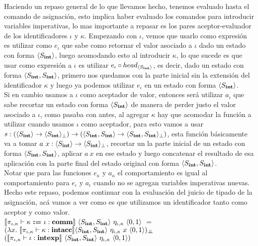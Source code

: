 Haciendo un repaso general de lo que llevamos hecho, tenemos evaluado hasta el comando
de asignaci\'on, esto implica haber evaluado los comandos para introducir variables 
imperativas, lo mas importante a repasar es los pares aceptor-evaluador de los
identificadores $\iota$ y $\kappa$. Empezando con $\iota$, vemos que usarlo como
expresi\'on es utilizar como $e_\iota$ que
sabe como retornar el valor asociado a $\iota$ dado un estado con forma $\langle S_{\textbf{int}} \rangle$,
luego acomodando esto al introducir $\kappa$, lo que sucede es que usar como expresi\'on
a $\iota$ es utilizar $e_\iota \circ head_{\langle S_{\textbf{int}} \rangle}$, es decir, dado
un estado con forma $\langle S_{\textbf{int}}, S_{\textbf{int}} \rangle$, primero nos quedamos con la
parte inicial sin la extensi\'on del identificador $\kappa$ y luego ya podemos
utilizar $e_\iota$ en un estado con forma $\langle S_{\textbf{int}} \rangle$.\\
Si en cambio usamos a $\iota$ como aceptador de valor, entonces ser\'a utilizar
$a_\iota$ que sabe recortar un estado con forma $\langle S_{\textbf{int}} \rangle$ de manera
de perder justo el valor asociado a $\iota$, como pasaba con antes, al agregar
$\kappa$ hay que acomodar la funci\'on a utilizar cuando usamos $\iota$ como aceptador,
para esto vamos a usar 
$s : (\langle S_{\textbf{int}} \rangle \rightarrow \langle S_{\textbf{int}} \rangle_{\bot})
	 \rightarrow 
	 (\langle S_{\textbf{int}},S_{\textbf{int}} \rangle \rightarrow \langle S_{\textbf{int}},S_{\textbf{int}} \rangle_{\bot})$, esta
funci\'on b\'asicamente va a tomar $a \ x : \langle S_{\textbf{int}} \rangle \rightarrow \langle S_{\textbf{int}} \rangle_{\bot}$,
recortar un la parte inicial de un estado con forma $\langle S_{\textbf{int}},S_{\textbf{int}} \rangle$, aplicar
$a \ x$ en ese estado y luego concatenar el resultado de esa aplicaci\'on con la parte
final del estado original con forma $\langle S_{\textbf{int}},S_{\textbf{int}} \rangle$.\\
Notar que para las funciones $e_\kappa$ y $a_\kappa$ el comportamiento es igual
al comportamiento para $e_\iota$ y $a_\iota$ cuando no se agregan variables imperativas 
nuevas. Hecho este repaso, podemos continuar con la evaluaci\'on del juicio de tipado
de la asignaci\'on, ac\'a vamos a ver como es que utilizamos un identificador 
tanto como aceptor y como valor.\\

$\llbracket \pi_{\iota,\kappa} \vdash \kappa \ \textbf{:=} \ \iota: \textbf{comm} \rrbracket
		\ \langle S_{\textbf{int}},S_{\textbf{int}} \rangle \ \eta_{\iota,\kappa}
		\ \langle 0,1 \rangle$ $=$\\
\indent \indent \indent \indent
$(\lambda x . \ \llbracket \pi_{\iota,\kappa} \vdash \kappa : \textbf{intacc} \rrbracket
	\langle S_{\textbf{int}},S_{\textbf{int}} \rangle 
	\ \eta_{\iota,\kappa}
	\ x \ \langle 0,1 \rangle)_{\bot \!\!\! \bot}$\\
\indent \indent \indent \indent \indent \indent \indent \indent
$(\llbracket  \pi_{\iota,\kappa} \vdash \iota : \textbf{intexp}  \rrbracket 
	\ \langle S_{\textbf{int}},S_{\textbf{int}} \rangle
	\ \eta_{\iota,\kappa} 
	\ \langle 0,1 \rangle)$\\
	
